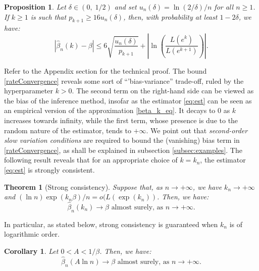 \documentclass[sn-mathphys-ay]{sn-jnl}%
\newtheorem{theorem}{Theorem}[section]%
\newtheorem{proposition}{Proposition}[section]%
\newtheorem{corollary}{Corollary}[section]
\begin{document}
\begin{proposition}\label{bias_variance_thm}
    Let \(\delta\in (0,\; 1/2)\) and set \(u_n( \delta) = \ln ( {2/\delta })/n\) for all $n\geq 1$. If \(k\geq 1\) is such that \(p_{k+1}\geq 16 u_n(\delta)\), then, with probability at least \(1-2\delta\), we have:
    \begin{equation}\label{rateConvergence}
        \left|\widehat{\beta}_{n}(k)-\beta\right|\leq 6\sqrt{\frac{u_n (\delta)}{p_{k+1}}} + \left| \ln\left(\frac{L(e^{k})}{L(e^{k+1})}\right) \right|.
    \end{equation}
\end{proposition}

Refer to the Appendix section for the technical proof. The bound \eqref{rateConvergence}
reveals some sort of ``'bias-variance'' trade-off, ruled by the hyperparameter $k>0$. The
second term on the right-hand side can be viewed as the bias of the inference method,
insofar as the estimator \eqref{eq:est} can be seen as an empirical version of the
approximation \eqref{beta_k_eq}. It decays to $0$ as $k$ increases towards infinity,
while the first term, whose presence is due to the random nature of the estimator, tends
to $+\infty$. We point out that \textit{second-order slow variation conditions}
\citep{GoldieSmith87} are required to bound the (vanishing) bias term in
\eqref{rateConvergence}, as shall be explained in subsection \ref{subsec:examples}. The
following result reveals that for an appropriate choice of \(k=k_n\), the estimator
\eqref{eq:est} is strongly consistent.

\begin{theorem}[Strong consistency]\label{consistency}
    Suppose that, as $n\rightarrow +\infty$, we have \(k_n\to +\infty\) and $(\ln n)\exp(k_n\beta)/n=o(L(\exp(k_n))$. Then, we have:
    \begin{equation*}
        \widehat{\beta}_n(k_n)\to\beta \text{ almost surely, as } n\rightarrow +\infty.
    \end{equation*}
\end{theorem}
In particular, as stated below, strong consistency is guaranteed when \(k_n\) is of logarithmic order.

\begin{corollary}\label{ln_strong_consistency}
    Let \(0<A<1/\beta\). Then, we have:
    \begin{equation*}
        \widehat{\beta}_n({A\ln n})\to\beta \text{ almost surely, as } n\rightarrow +\infty.
    \end{equation*}
\end{corollary}
\end{document}
